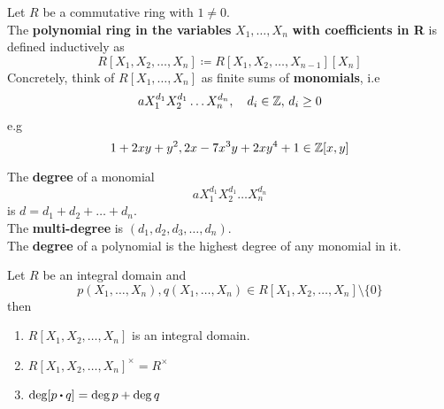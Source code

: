 \documentclass[../Main.tex]{subfiles}
\begin{document}
\begin{dfn}
	Let $R$ be a commutative ring with $1\ne 0$. \\
	The \textbf{polynomial ring in the variables }$X_1,\dots,X_n$ \textbf{with coefficients in R} is defined inductively as
	\[R[X_1,X_2,\dots,X_n]\coloneqq R[X_1,X_2,\dots,X_{n-1}][X_n]\]
	Concretely, think of $R[X_1,\dots,X_n]$ as finite sums of \textbf{monomials}, i.e 
	\[aX_1^{d_1}X_2^{d_1}\dots X_n^{d_n},\quad d_i\in \mathbb{Z}, \, d_i\ge 0\]
	e.g
	\[1+2xy+y^2,2x-7x^3y+2xy^4+1\in \mathbb{Z}[x,y]\]
\end{dfn}
\begin{dfn}
	The \textbf{degree} of a monomial
	\[aX_1^{d_1}X_2^{d_1}\dots X_n^{d_n}\]
	is $d=d_1+d_2+\dots+d_n$.\\
	The \textbf{multi-degree} is $(d_1,d_2,d_3,\dots,d_n)$.\\
	The \textbf{degree} of a polynomial is the highest degree of any monomial in it.
\end{dfn}
\begin{prop}
	Let $R$ be an integral domain and
	\[p(X_1,\dots,X_n),q(X_1,\dots,X_n)\in R[X_1,X_2,\dots,X_n]\setminus\{0\}\] then
	\begin{enumerate}[label=(\arabic*)]
		\item $R[X_1,X_2,\dots,X_n]$ is an integral domain.
		\item $R[X_1,X_2,\dots,X_n]^\times = R^\times$
		\item $\deg[p\rdot q]=\deg p+\deg q$
	\end{enumerate}
\end{prop}
\end{document}
